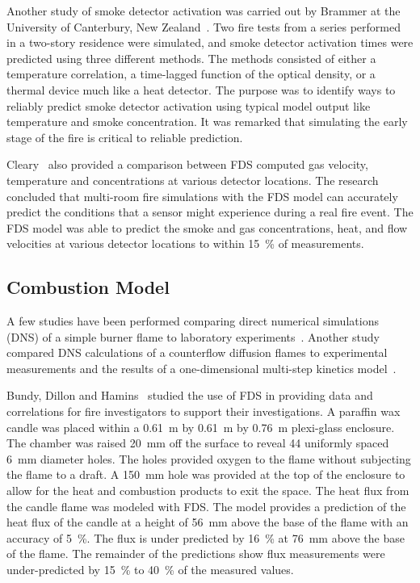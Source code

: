 Another study of smoke detector  activation was carried out by Brammer at  the University  of Canterbury,  New  Zealand~\cite{Brammer:1}. Two fire
tests from  a series  performed  in a  two-story residence  were simulated, and  smoke detector  activation times were  predicted using three
different methods. The methods consisted of either a temperature correlation,  a time-lagged  function  of the  optical  density, or  a thermal
device much like a heat detector.  The purpose was to identify ways to reliably predict smoke detector activation using typical model output like
temperature and  smoke concentration. It was remarked that simulating  the  early stage  of  the  fire  is critical  to  reliable prediction.

Cleary~\cite{Cleary:1} also provided a comparison between FDS computed gas  velocity,  temperature  and  concentrations at  various  detector
locations.   The research concluded  that multi-room  fire simulations with the FDS model can accurately predict the conditions that a sensor might
experience during a real fire  event.  The FDS model was able to predict the smoke and gas concentrations, heat, and flow velocities at various
detector locations to within 15~\% of measurements.




\subsection{Combustion Model}

A few studies have been performed comparing direct numerical
simulations (DNS) of a simple burner flame to laboratory
experiments~\cite{Mukhopadhyay:1}. Another study compared DNS
calculations of a counterflow diffusion flames to experimental
measurements and the results of a one-dimensional multi-step kinetics
model~\cite{Hamins:NASA}.

Bundy,  Dillon and  Hamins~\cite{Dillon:1,Hamins:FPE2005}  studied the use of FDS  in providing data and correlations  for fire investigators to
support their investigations.   A paraffin  wax candle  was placed within  a  0.61~m by  0.61~m  by  0.76~m  plexi-glass enclosure.   The chamber was
raised 20~mm off the surface to reveal 44 uniformly spaced 6~mm diameter holes.   The holes provided oxygen to  the flame without subjecting the
flame to a draft.   A 150~mm hole was  provided at the top of the enclosure to allow  for the heat and combustion products to exit the space.  The
heat flux  from the candle flame was modeled with FDS.  The model  provides a prediction of the heat  flux of the candle at a height of  56~mm above
the base of the flame  with an accuracy of 5~\%. The flux is under predicted  by 16~\% at 76~mm above the base of the  flame. The remainder  of the
predictions show  flux measurements were under-predicted by 15~\% to 40~\% of the measured values.


